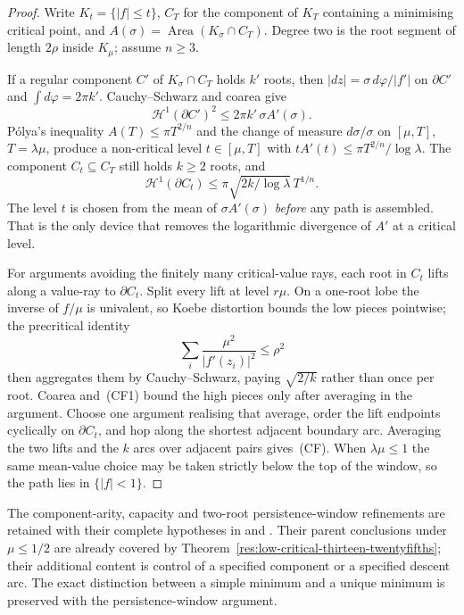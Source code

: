 \documentclass[11pt]{article}
\begin{document}
\begin{proof}
Write $K_t=\{|f|\le t\}$, $C_T$ for the component of $K_T$ containing a
minimising critical point, and $A(\sigma)=\operatorname{Area}(K_\sigma\cap C_T)$.
Degree two is the root segment of length $2\rho$ inside $K_\mu$; assume
$n\ge3$.

If a regular component $C'$ of $K_\sigma\cap C_T$ holds $k'$ roots, then
$|dz|=\sigma\,d\varphi/|f'|$ on $\partial C'$ and $\int d\varphi=2\pi k'$.
Cauchy--Schwarz and coarea give
\[
 \mathcal H^1(\partial C')^2
 \le2\pi k'\,\sigma A'(\sigma).                     \tag{CF1}
\]
P\'olya's inequality $A(T)\le\pi T^{2/n}$ and the change of measure
$d\sigma/\sigma$ on $[\mu,T]$, $T=\lambda\mu$, produce a non-critical level
$t\in[\mu,T]$ with $t A'(t)\le\pi T^{2/n}/\log\lambda$.  The component
$C_t\subseteq C_T$ still holds $k\ge2$ roots, and
\[
 \mathcal H^1(\partial C_t)
 \le\pi\sqrt{2k/\log\lambda}\,T^{1/n}.
\]
The level $t$ is chosen from the mean of $\sigma A'(\sigma)$ \emph{before}
any path is assembled.  That is the only device that removes the logarithmic
divergence of $A'$ at a critical level.

For arguments avoiding the finitely many critical-value rays, each root in
$C_t$ lifts along a value-ray to $\partial C_t$.  Split every lift at level
$r\mu$.  On a one-root lobe the inverse of $f/\mu$ is univalent, so Koebe
distortion bounds the low pieces pointwise; the precritical identity
\[
 \sum_i\frac{\mu^2}{|f'(z_i)|^2}\le\rho^2          \tag{CF2}
\]
then aggregates them by Cauchy--Schwarz, paying $\sqrt{2/k}$ rather than
once per root.  Coarea and~(CF1) bound the high pieces only after averaging
in the argument.  Choose one argument realising that average, order the lift
endpoints cyclically on $\partial C_t$, and hop along the shortest adjacent
boundary arc.  Averaging the two lifts and the $k$ arcs over adjacent pairs
gives~(CF).  When $\lambda\mu\le1$ the same mean-value choice may be taken
strictly below the top of the window, so the path lies in $\{|f|<1\}$.
\end{proof}

The component-arity, capacity and two-root persistence-window refinements
are retained with their complete hypotheses in
 and
.
Their parent conclusions under $\mu\le1/2$ are already covered by
Theorem~\ref{res:low-critical-thirteen-twentyfifths}; their additional content
is control of a specified component or a specified descent arc.
The exact distinction between a simple minimum and a unique minimum is
preserved with the persistence-window argument.
\end{document}
